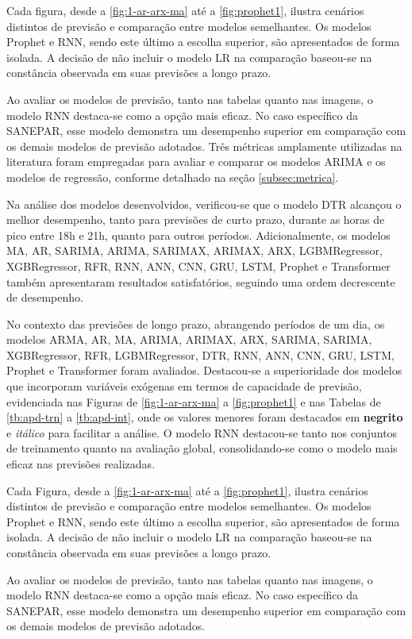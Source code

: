 Cada figura, desde a \ref{fig:1-ar-arx-ma} até a \ref{fig:prophet1}, ilustra cenários distintos de previsão e comparação entre modelos semelhantes. Os modelos Prophet e RNN, sendo este último a escolha superior, são apresentados de forma isolada. A decisão de não incluir o modelo LR na comparação baseou-se na constância observada em suas previsões a longo prazo.

Ao avaliar os modelos de previsão, tanto nas tabelas quanto nas imagens, o modelo RNN destaca-se como a opção mais eficaz. No caso específico da SANEPAR, esse modelo demonstra um desempenho superior em comparação com os demais modelos de previsão adotados. Três métricas amplamente utilizadas na literatura foram empregadas para avaliar e comparar os modelos ARIMA e os modelos de regressão, conforme detalhado na seção \ref{subsec:metrica}.

Na análise dos modelos desenvolvidos, verificou-se que o modelo DTR alcançou o melhor desempenho, tanto para previsões de curto prazo, durante as horas de pico entre 18h e 21h, quanto para outros períodos. Adicionalmente, os modelos MA, AR, SARIMA, ARIMA, SARIMAX, ARIMAX, ARX, LGBMRegressor, XGBRegressor, RFR, RNN, ANN, CNN, GRU, LSTM, Prophet e Transformer também apresentaram resultados satisfatórios, seguindo uma ordem decrescente de desempenho.

No contexto das previsões de longo prazo, abrangendo períodos de um dia, os modelos ARMA, AR, MA, ARIMA, ARIMAX, ARX, SARIMA, SARIMA, XGBRegressor, RFR, LGBMRegressor, DTR, RNN, ANN, CNN, GRU, LSTM, Prophet e Transformer foram avaliados. Destacou-se a superioridade dos modelos que incorporam variáveis exógenas em termos de capacidade de previsão, evidenciada nas Figuras de \ref{fig:1-ar-arx-ma} a \ref{fig:prophet1} e nas Tabelas de \ref{tb:apd-trn} a \ref{tb:apd-int}, onde os valores menores foram destacados em \textbf{negrito} e \textit{itálico} para facilitar a análise. O modelo RNN destacou-se tanto nos conjuntos de treinamento quanto na avaliação global, consolidando-se como o modelo mais eficaz nas previsões realizadas.

Cada Figura, desde a \ref{fig:1-ar-arx-ma} até a \ref{fig:prophet1}, ilustra cenários distintos de previsão e comparação entre modelos semelhantes. Os modelos Prophet e RNN, sendo este último a escolha superior, são apresentados de forma isolada. A decisão de não incluir o modelo LR na comparação baseou-se na constância observada em suas previsões a longo prazo.

Ao avaliar os modelos de previsão, tanto nas tabelas quanto nas imagens, o modelo RNN destaca-se como a opção mais eficaz. No caso específico da SANEPAR, esse modelo demonstra um desempenho superior em comparação com os demais modelos de previsão adotados.



